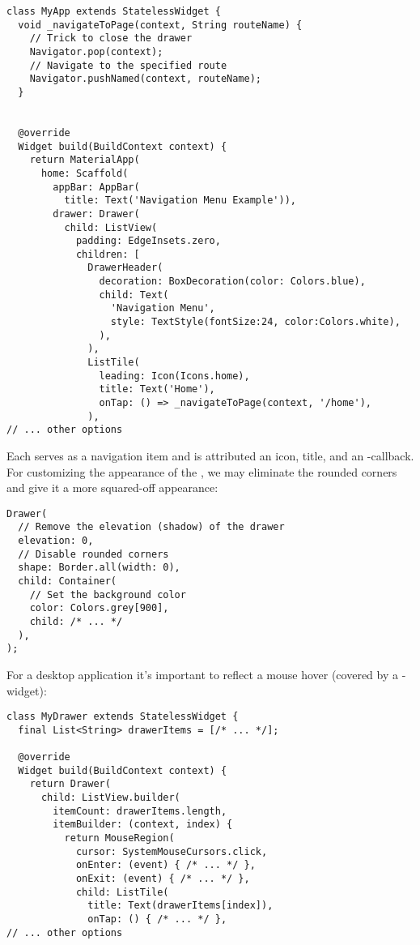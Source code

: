 \begin{lstlisting}
class MyApp extends StatelessWidget {
  void _navigateToPage(context, String routeName) {
    // Trick to close the drawer
    Navigator.pop(context); 
    // Navigate to the specified route
    Navigator.pushNamed(context, routeName); 
  }


  @override
  Widget build(BuildContext context) {
    return MaterialApp(
      home: Scaffold(
        appBar: AppBar(
          title: Text('Navigation Menu Example')),
        drawer: Drawer(
          child: ListView(
            padding: EdgeInsets.zero,
            children: [
              DrawerHeader(
                decoration: BoxDecoration(color: Colors.blue),
                child: Text(
                  'Navigation Menu',
                  style: TextStyle(fontSize:24, color:Colors.white),
                ),
              ),
              ListTile(
                leading: Icon(Icons.home),
                title: Text('Home'),
                onTap: () => _navigateToPage(context, '/home'),
              ),
// ... other options
\end{lstlisting}

\noindent Each  serves as a navigation item and is attributed an icon, title, and an -callback. 
For customizing the appearance of the , we may eliminate the rounded corners and give it a more squared-off 
appearance:

\begin{lstlisting}
Drawer(
  // Remove the elevation (shadow) of the drawer
  elevation: 0,
  // Disable rounded corners
  shape: Border.all(width: 0), 
  child: Container(
    // Set the background color
    color: Colors.grey[900], 
    child: /* ... */
  ),
);
\end{lstlisting}

\noindent For a desktop application it's important to reflect a mouse hover (covered by a -widget): 

\begin{lstlisting}
class MyDrawer extends StatelessWidget {
  final List<String> drawerItems = [/* ... */];

  @override
  Widget build(BuildContext context) {
    return Drawer(
      child: ListView.builder(
        itemCount: drawerItems.length,
        itemBuilder: (context, index) {
          return MouseRegion(
            cursor: SystemMouseCursors.click,
            onEnter: (event) { /* ... */ },
            onExit: (event) { /* ... */ },
            child: ListTile(
              title: Text(drawerItems[index]),
              onTap: () { /* ... */ },
// ... other options
\end{lstlisting}

